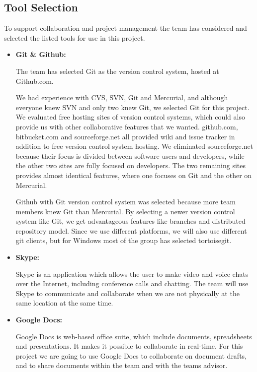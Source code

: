 \subsection{Tool Selection}
To support collaboration and project management the team has considered and selected the listed tools for use in this project.

\begin{itemize}
\item \textbf{Git \& Github:} 

The team has selected Git as the version control system, hosted at Github.com.

We had experience with CVS, SVN, Git and Mercurial, and although everyone knew SVN and only two knew Git, we selected Git for this project. We evaluated free hosting sites of version control systems, which could also provide us with other collaborative features that we wanted. github.com, bitbucket.com and sourceforge.net all provided wiki and issue tracker in addition to free version control system hosting. We eliminated sourceforge.net because their focus is divided between software users and developers, while the other two sites are fully focused on developers. The two remaining sites provides almost identical features, where one focuses on Git and the other on Mercurial.

Github with Git version control system was selected because more team members knew Git than Mercurial. By selecting a newer version control system like Git, we get advantageous features like branches and distributed repository model. Since we use different platforms, we will also use different git clients, but for Windows most of the group has selected tortoisegit.

\item \textbf{Skype:} 

Skype is an application which allows the user to make video and voice chats over the Internet, including conference calls and chatting. The team will use Skype to communicate and collaborate when we are not physically at the same location at the same time.

\item \textbf{Google Docs:} 

Google Docs is web-based office suite, which include documents, spreadsheets and presentations. It makes it possible to collaborate in real-time. For this project we are going to use Google Docs to collaborate on document drafts, and to share documents within the team and with the teams advisor.


\end{itemize}
